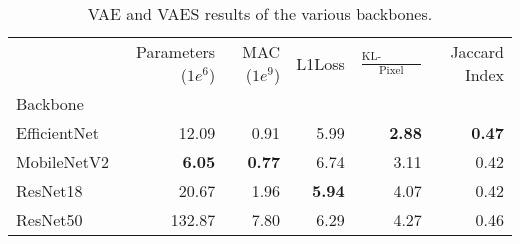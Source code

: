 \begin{table}[ht]
    \centering
    \caption{VAE and VAES results of the various backbones.}
    \label{tab:vae-backbones-results}
    \begin{tabular}{lrrrrr}
        \toprule
                     & Parameters ($1e^6$) & MAC ($1e^9$)  & L1Loss        & $\frac{\text{KL-Divergence}}{\text{Pixel}}$ & Jaccard Index \\
        Backbone     &                     &               &               &                                                             \\
        \midrule
        EfficientNet & 12.09               & 0.91          & 5.99          & \textbf{2.88}                               & \textbf{0.47} \\
        MobileNetV2  & \textbf{6.05}       & \textbf{0.77} & 6.74          & 3.11                                        & 0.42          \\
        ResNet18     & 20.67               & 1.96          & \textbf{5.94} & 4.07                                        & 0.42          \\
        ResNet50     & 132.87              & 7.80          & 6.29          & 4.27                                        & 0.46          \\
        \bottomrule
    \end{tabular}
\end{table}
